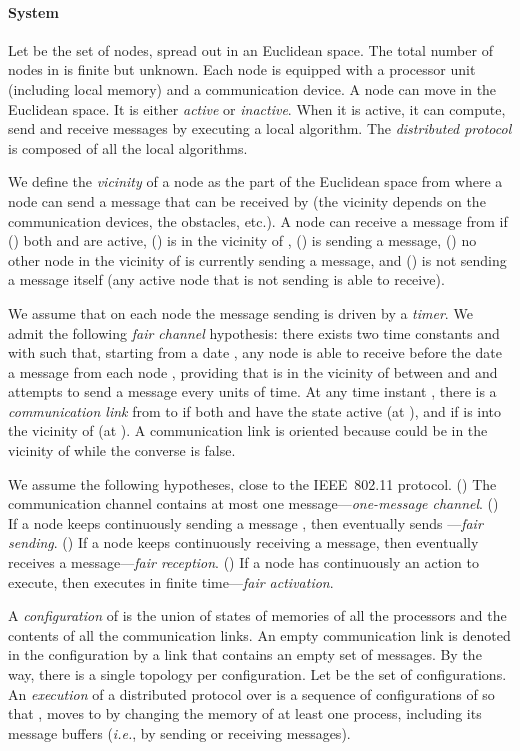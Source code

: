 \documentclass[11pt,english]{article}
\newcommand{\Latin}[1]{\textit{#1}}
\newcommand{\ie}{\Latin{i.e.},\xspace}
\begin{document}
\paragraph{System}
Let  be the set of nodes, spread out in an Euclidean space.  The total number
of nodes in  is finite but unknown.  Each node is equipped with a processor
unit (including local memory) and a communication device. A node can move in the
Euclidean space.  It is either \emph{active} or \emph{inactive}. When it is active, it can
compute, send and receive messages by executing a local algorithm.  The
\emph{distributed protocol}  is composed of all the local
algorithms.

We define the \emph{vicinity} of a node  as the part of the Euclidean space
from where a node  can send a message that can be received by  (the
vicinity depends on the communication devices, the obstacles, etc.).  A node 
can receive a message from  if () both  and  are active, () 
is in the vicinity of , ()  is sending a message, () no other
node in the vicinity of  is currently sending a message, and ()  is not
sending a message itself (any active node that is not sending is able to
receive).

We assume that on each node the message sending is driven by a {\em timer}.
We admit the following \emph{fair channel} hypothesis: there exists two time
constants  and  with  such that, starting from
a date , any node  is able to receive before the date  a message
from each node , providing that  is in the vicinity of  between  and
 and attempts to send a message every  units of time.
At any time instant , there is a \emph{communication link} from  to  if
both  and  have the state active (at ), and if  is into the vicinity
of  (at ).  A communication link is oriented because  could be in the
vicinity of  while the converse is false.

We assume the following hypotheses, close to the IEEE~802.11 protocol.  
() The communication channel contains at most one message---{\em one-message channel}.
() If a node  keeps continuously sending a message , then  
eventually sends ---{\em fair sending}. 
() If a node  keeps continuously receiving a message, then  
eventually receives a message---{\em fair reception}. 
() If a node  has continuously an action  to execute, then  executes
 in finite time---{\em fair activation}.


A \emph{configuration}  of  is the union of states of memories
of all the processors and the contents of all the communication links. An empty
communication link is denoted in the configuration by a link that contains an
empty set of messages. By the way, there is a single topology per configuration.
Let  be the set of configurations.
An \emph{execution} of a distributed protocol  over 
is a sequence of configurations  of  so that
,  moves to  by changing the memory of at least one process, including its message
buffers (\ie by sending or receiving messages).  
\end{document}
